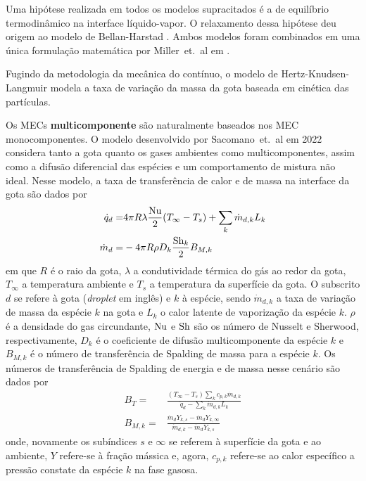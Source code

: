 Uma hipótese realizada em todos os modelos supracitados é a de equilíbrio termodinâmico na interface líquido-vapor.
O relaxamento dessa hipótese deu origem ao modelo de Bellan-Harstad \cite{BellanJ1987}.
Ambos modelos foram combinados em uma única formulação matemática por Miller~et.~al em \cite{MillerR1998}.

Fugindo da metodologia da mecânica do contínuo, o modelo de Hertz-Knudsen-Langmuir  modela a taxa de variação da massa da gota baseada em cinética das partículas.

Os MECs \textbf{multicomponente} são naturalmente baseados nos MEC monocomponentes.
O modelo desenvolvido por Sacomano~et.~al em 2022 \cite{SacomanoF2022IJHMT} considera tanto a gota quanto os gases ambientes como multicomponentes, assim como a difusão diferencial das espécies e um comportamento de mistura não ideal.%
Nesse modelo, a taxa de transferência de calor e de massa na interface da gota são dados por 
\begin{align}
    \dot q_d =& 4\pi R \lambda \frac{\mathrm{Nu}}{2}(T_\infty - T_s) + \sum_k \dot m_{d,k} L_k \label{eq:dmd} \\
    \dot m_d =& -4 \pi R \rho D_k \frac{\mathrm{Sh}_k}{2}B_{M,k} \label{eq:dqd}
\end{align}
em que $R$ é o raio da gota, $\lambda$ a condutividade térmica do gás ao redor da gota, $T_\infty$ a temperatura ambiente e $T_s$ a temperatura da superfície da gota. 
O subscrito $d$ se refere à gota (\emph{droplet} em inglês) e $k$ à espécie, sendo $\dot m_{d,k}$ a taxa de variação de massa da espécie $k$ na gota e $L_k$ o calor latente de vaporização da espécie $k$.
$\rho$ é a densidade do gas circundante, $\mathrm{Nu}$ e $\mathrm{Sh}$ são os número de Nusselt e Sherwood, respectivamente, $D_k$ é o coeficiente de difusão multicomponente da espécie $k$ e $B_{M,k}$ é o número de transferência de Spalding de massa para a espécie $k$.
Os números de transferência de Spalding de energia e de massa nesse cenário são dados por
\begin{align}
    B_T =& \frac
        {(T_\infty - T_s) \sum_k c_{p,k}\dot m_{d,k}}
        {\dot q_d - \sum_k \dot m_{d,k} L_k} \label{eq:B_T}\\
    B_{M,k} =& \frac
        {\dot m_d Y_{k,s} - \dot m_d Y_{k,\infty}}
        {\dot m_{d,k} - \dot m_d Y_{k,s}}\label{eq:B_Mk}
\end{align}
onde, novamente os subíndices $s$ e $\infty$ se referem à superfície da gota e ao ambiente, $Y$ refere-se à fração mássica e, agora, $c_{p,k}$ refere-se ao calor específico a pressão constate da espécie $k$ na fase gasosa.
